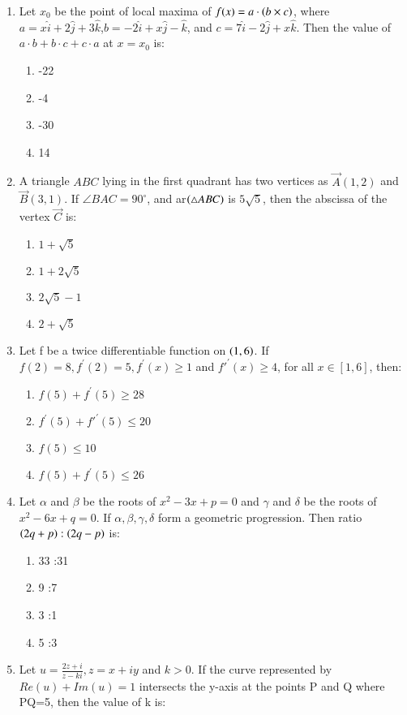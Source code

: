 \documentclass[journal,12pt,twocolumn]{IEEEtran}
\theoremstyle{remark}
\begin{document}
\begin{enumerate}
\begin{enumerate}
\end{enumerate}
\item Let $x_0$ be the point of local maxima of $f(x)=a\cdot\left(b\times c\right)$, where $a=x\hat{i}+2\hat{j}+3\hat{k}$,$b=-2\hat{i}+x\hat{j}-\hat{k}$, and $c=7\hat{i}-2\hat{j}+x\hat{k}$. Then the value of $ a\cdot b+b\cdot c+c\cdot a$ at $x=x_0$ is:
\begin{enumerate}
    \item -22
    \item -4
    \item -30
    \item 14
\end{enumerate}
\item A triangle $ABC$ lying in the first quadrant has two vertices as $ \vec{A}(1,2)$ and $\vec{B}(3,1)$. If $\angle BAC=90^\circ$, and ar$\left(\triangle ABC\right)$ is $5\sqrt{5}$, then the abscissa of the vertex $\vec{C}$ is:
\begin{enumerate}
    \item $1+\sqrt{5}$
    \item $1+2\sqrt{5}$
    \item $2\sqrt{5}-1$
    \item $2+\sqrt{5}$
\end{enumerate}
\item Let f be a twice differentiable function on $\left(1,6\right)$. If $f(2)=8, f^\prime{}{}(2)=5, f^\prime(x)\geq1$ and $f'^\prime(x)\geq4$, for all $x\in [1,6]$, then:
\begin{enumerate}
    \item $f(5)+f^\prime(5)\geq28$
    \item $f^\prime(5)+f'^\prime(5)\leq20$
    \item $f(5)\leq10$
    \item $f(5)+f^\prime(5)\leq26$
\end{enumerate}
\item Let $\alpha$ and $\beta$ be the roots of $x^2-3x+p=0$ and $\gamma$ and $\delta$ be the roots of $x^2-6x+q=0$. If $\alpha,\beta,\gamma,\delta$ form a geometric progression. Then ratio $\left(2q+p\right):\left(2q-p\right)$ is:
\begin{enumerate}
    \item 33 :31
    \item 9 :7
    \item 3 :1
    \item 5 :3
\end{enumerate}
\item Let $u=\frac{2z+i}{z-ki},z=x+iy$ and $k>0$. If the curve represented by $Re(u)+Im(u)=1$ intersects the y-axis at the points P and Q where PQ=5, then the value of k is:

\end{enumerate}
\end{document}
